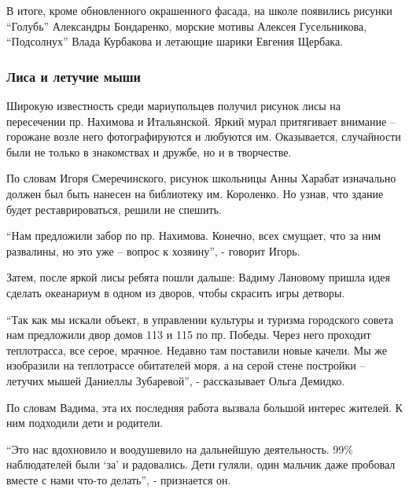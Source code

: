 В итоге, кроме обновленного окрашенного фасада, на школе появились рисунки
\enquote{Голубь} Александры Бондаренко, морские мотивы Алексея Гусельникова,
\enquote{Подсолнух} Влада Курбакова и летающие шарики Евгения Щербака.

\subsubsection{Лиса и летучие мыши}

Широкую известность среди мариупольцев получил рисунок лисы на пересечении пр.
Нахимова и Итальянской. Яркий мурал притягивает внимание – горожане возле него
фотографируются и любуются им. Оказывается, случайности были не только в
знакомствах и дружбе, но и в творчестве.

По словам Игоря Смеречинского, рисунок школьницы Анны Харабат изначально должен
был быть нанесен на библиотеку им. Короленко. Но узнав, что здание будет
реставрироваться, решили не спешить.


\enquote{Нам предложили забор по пр. Нахимова. Конечно, всех смущает, что за ним
развалины, но это уже – вопрос к хозяину}, - говорит Игорь.


Затем, после яркой лисы ребята пошли дальше: Вадиму Лановому пришла идея
сделать океанариум в одном из дворов, чтобы скрасить игры детворы.

\enquote{Так как мы искали объект, в управлении культуры и туризма городского совета
нам предложили двор домов 113 и 115 по пр. Победы. Через него проходит
теплотрасса, все серое, мрачное. Недавно там поставили новые качели. Мы же
изобразили на теплотрассе обитателей моря, а на серой стене постройки – летучих
мышей Даниеллы Зубаревой}, - рассказывает Ольга Демидко.


По словам Вадима, эта их последняя работа вызвала большой интерес жителей. К
ним подходили дети и родители.


\enquote{Это нас вдохновило и воодушевило на дальнейшую деятельность. 99\% наблюдателей
были \enquote{за} и радовались. Дети гуляли, один мальчик даже пробовал вместе с нами
что-то делать}, - признается он.

